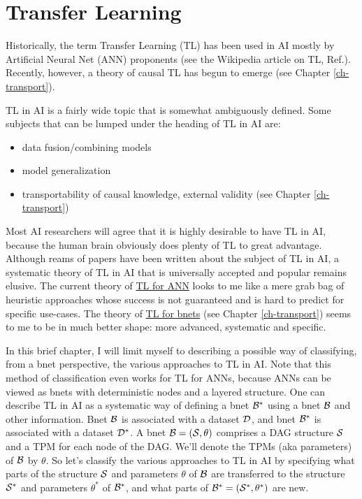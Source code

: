 \chapter{Transfer Learning}
\label{ch-transfer}

Historically,
the term Transfer Learning (TL)
has been used in AI mostly by Artificial Neural Net (ANN)
proponents (see the Wikipedia article on TL,
 Ref.\cite{wiki-TL}).
Recently, however,
 a theory of causal TL
has begun to emerge
(see Chapter \ref{ch-transport}).

TL in AI is a
fairly wide topic that 
is somewhat ambiguously defined.
Some subjects that can be lumped
under the heading of TL in AI are:
\begin{itemize}
\item data fusion/combining models
\item model generalization
\item transportability of 
causal knowledge, external validity
(see Chapter \ref{ch-transport})
\end{itemize}


Most AI researchers
will agree that it is highly desirable 
to have TL in AI, because the human 
brain obviously does  plenty of TL
to great advantage.
Although reams of papers 
have been written about the subject of TL in AI,
a systematic theory of TL in AI
that is universally accepted and popular
remains elusive. The current
theory of \ul{TL for ANN} looks to me 
like a mere grab bag
of
 heuristic approaches
whose success is not guaranteed
and is hard to predict
for specific use-cases.
The theory of \ul{TL for bnets} (see
Chapter \ref{ch-transport})
seems to me to be in much 
better shape: more
advanced,
systematic and specific.



In this brief chapter, I will
limit myself to describing a possible way of
 classifying,
from a bnet perspective, the 
various approaches to TL
in AI.
Note that this method of classification
even works for TL for ANNs,
because ANNs can be
viewed as bnets with deterministic nodes
and a layered structure.
One can describe TL in AI as 
a systematic way 
of  defining a bnet 
${\cal B}^*$ 
using a bnet 
${\cal B}$
and other information.
Bnet ${\cal B}$ is associated with a dataset ${\cal D}$,
and bnet ${\cal B}^*$
is associated with a dataset ${\cal D}^*$.
A bnet ${\cal B}=({\cal S}, \theta)$ comprises
a DAG structure ${\cal S}$ and 
a TPM for each node of the DAG. We'll denote
the TPMs (aka parameters) of ${\cal B}$ by $\theta$. So let's
classify the various approaches to TL in AI 
by specifying what parts
of the structure ${\cal S}$ and parameters $\theta$
of ${\cal B}$
are transferred to the structure
${\cal S}^*$ and parameters $\theta^*$
of ${\cal B}^*$, and what parts of 
${\cal B}^*=({\cal S}^*, \theta^*)$ are new.

